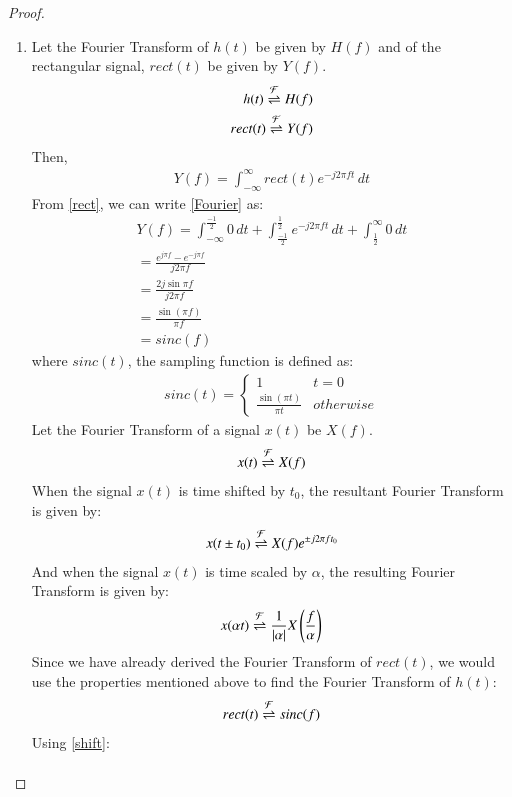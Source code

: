 \documentclass[journal,12pt,twocolumn]{IEEEtran}
\begin{document}
\begin{proof}
\begin{enumerate}
\item Let the Fourier Transform of $h(t)$ be given by $H(f)$ and of the rectangular signal, $rect(t)$ be given by $Y(f)$.
\begin{align}
    h(t) \overset{\mathcal{F}}{ \rightleftharpoons} H(f)\\
    rect(t) \overset{\mathcal{F}}{ \rightleftharpoons} Y(f)
    \end{align}
    Then,
    \begin{align}
    Y(f) = \int_{-\infty}^\infty rect(t)e^{-j2\pi f t}\,dt
    \label{Fourier}
\end{align}
From \eqref{rect}, we can write \eqref{Fourier} as:
\begin{align}
   Y(f) = \int_{-\infty}^\frac{-1}{2} 0\,dt + \int_{\frac{-1}{2}}^\frac{1}{2} e^{-j2\pi ft}\,dt + \int_\frac{1}{2}^\infty 0\,dt\\
    = \frac{e^{j\pi f} - e^{-j \pi f}}{j2\pi f}\\
     = \frac{2j\sin{\pi f}}{j2\pi f}\\
      = \frac{\sin (\pi f)}{\pi f}\\
       = sinc(f)
\end{align}
where $sinc(t)$, the sampling function is defined as:
\begin{align}
    sinc(t) = 
    \begin{cases}
    1 & t = 0\\
    \frac{\sin(\pi t)}{\pi t} & otherwise
    \end{cases}
\end{align}
Let the Fourier Transform of a signal $x(t)$ be $X(f)$.
\begin{align}
    x(t) \overset{\mathcal{F}}{ \rightleftharpoons} X(f)
\end{align}
When the signal $x(t)$ is time shifted by $t_0$, the resultant Fourier Transform is given by:
\begin{align}
    x(t \pm t_0) \overset{\mathcal{F}}{ \rightleftharpoons} X(f)e^{\pm j2\pi ft_0}
    \label{shift}
\end{align}
And when the signal $x(t)$ is time scaled by $\alpha$, the resulting Fourier Transform is given by:
\begin{align}
    x(\alpha t) \overset{\mathcal{F}}{ \rightleftharpoons} \frac{1}{\left\vert\alpha\right\vert}X\left(\frac{f}{\alpha}\right)
    \label{scale}
\end{align}
Since we have already derived the Fourier Transform of $rect(t)$, we would use the properties mentioned above to find the Fourier Transform of $h(t)$:
\begin{align}
    rect(t) \overset{\mathcal{F}}{ \rightleftharpoons} sinc( f)
\end{align}
Using \eqref{shift}:
\begin{align}

\end{align}
\end{enumerate}
\end{proof}
\end{document}
